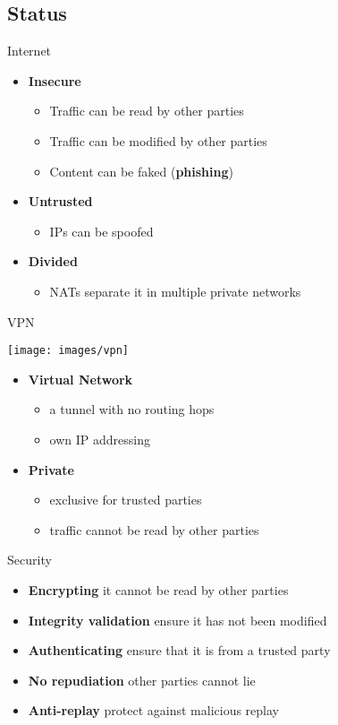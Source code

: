 \documentclass{beamer}
\begin{document}
\subsection*{Status}
\begin{frame}{Internet}
	\begin{itemize}
	\item \textbf{Insecure}
		\begin{itemize}
		\item Traffic can be read by other parties
		\item Traffic can be modified by other parties
		\item Content can be faked (\textbf{phishing})
		\end{itemize}
	\item \textbf{Untrusted}
		\begin{itemize}
		\item IPs can be spoofed
		\end{itemize}
	\item \textbf{Divided}
		\begin{itemize}
		\item NATs separate it in multiple private networks
		\end{itemize}
	\end{itemize}
\end{frame}
\begin{frame}{VPN}
	\begin{center}
	\texttt{[image: images/vpn]}
	\end{center}
	\begin{itemize}
	\item \textbf{Virtual Network}
		\begin{itemize}
		\item a tunnel with no routing hops
		\item own IP addressing
		\end{itemize}
	\item \textbf{Private}
		\begin{itemize}
		\item exclusive for trusted parties
		\item traffic cannot be read by other parties
		\end{itemize}
	\end{itemize}
\end{frame}
\begin{frame}{Security}
	\begin{itemize}
	\item \textbf{Encrypting} it cannot be read by other parties
	\item \textbf{Integrity validation} ensure it has not been modified
	\item \textbf{Authenticating} ensure that it is from a trusted party
	\item \textbf{No repudiation} other parties cannot lie
	\item \textbf{Anti-replay} protect against malicious replay
	\end{itemize}
\end{frame}
\end{document}
